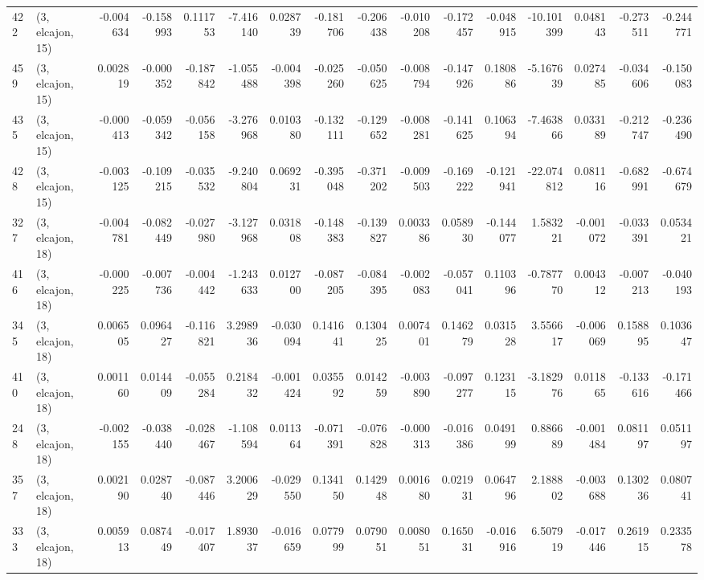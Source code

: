 \begin{tabular}{llrrrrrrrrrrrrrr}
422 &  (3, elcajon, 15) &  -0.004634 & -0.158993 &  0.111753 &   -7.416140 &  0.028739 &  -0.181706 & -0.206438 & -0.010208 & -0.172457 & -0.048915 &  -10.101399 &  0.048143 & -0.273511 & -0.244771 \\
459 &  (3, elcajon, 15) &   0.002819 & -0.000352 & -0.187842 &   -1.055488 & -0.004398 &  -0.025260 & -0.050625 & -0.008794 & -0.147926 &  0.180886 &   -5.167639 &  0.027485 & -0.034606 & -0.150083 \\
435 &  (3, elcajon, 15) &  -0.000413 & -0.059342 & -0.056158 &   -3.276968 &  0.010380 &  -0.132111 & -0.129652 & -0.008281 & -0.141625 &  0.106394 &   -7.463866 &  0.033189 & -0.212747 & -0.236490 \\
428 &  (3, elcajon, 15) &  -0.003125 & -0.109215 & -0.035532 &   -9.240804 &  0.069231 &  -0.395048 & -0.371202 & -0.009503 & -0.169222 & -0.121941 &  -22.074812 &  0.081116 & -0.682991 & -0.674679 \\
327 &  (3, elcajon, 18) &  -0.004781 & -0.082449 & -0.027980 &   -3.127968 &  0.031808 &  -0.148383 & -0.139827 &  0.003386 &  0.058930 & -0.144077 &    1.583221 & -0.001072 & -0.033391 &  0.053421 \\
416 &  (3, elcajon, 18) &  -0.000225 & -0.007736 & -0.004442 &   -1.243633 &  0.012700 &  -0.087205 & -0.084395 & -0.002083 & -0.057041 &  0.110396 &   -0.787770 &  0.004312 & -0.007213 & -0.040193 \\
345 &  (3, elcajon, 18) &   0.006505 &  0.096427 & -0.116821 &    3.298936 & -0.030094 &   0.141641 &  0.130425 &  0.007401 &  0.146279 &  0.031528 &    3.556617 & -0.006069 &  0.158895 &  0.103647 \\
410 &  (3, elcajon, 18) &   0.001160 &  0.014409 & -0.055284 &    0.218432 & -0.001424 &   0.035592 &  0.014259 & -0.003890 & -0.097277 &  0.123115 &   -3.182976 &  0.011865 & -0.133616 & -0.171466 \\
248 &  (3, elcajon, 18) &  -0.002155 & -0.038440 & -0.028467 &   -1.108594 &  0.011364 &  -0.071391 & -0.076828 & -0.000313 & -0.016386 &  0.049199 &    0.886689 & -0.001484 &  0.081197 &  0.051197 \\
357 &  (3, elcajon, 18) &   0.002190 &  0.028740 & -0.087446 &    3.200629 & -0.029550 &   0.134150 &  0.142948 &  0.001680 &  0.021931 &  0.064796 &    2.188802 & -0.003688 &  0.130236 &  0.080741 \\
333 &  (3, elcajon, 18) &   0.005913 &  0.087449 & -0.017407 &    1.893037 & -0.016659 &   0.077999 &  0.079051 &  0.008051 &  0.165031 & -0.016916 &    6.507919 & -0.017446 &  0.261915 &  0.233578 \\

\end{tabular}
